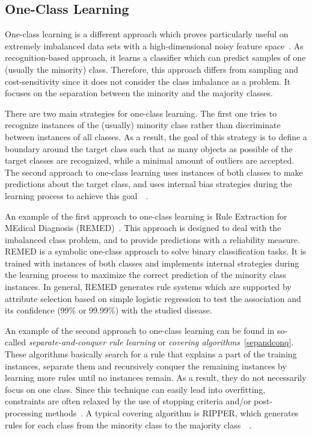 \subsection{One-Class Learning}\label{one-class}
One-class learning is a different approach which proves particularly useful on extremely imbalanced data sets with a high-dimensional noisy feature space~\cite{raskutti}. As recognition-based approach, it learns a classifier which can predict samples of one (usually the minority) class.  Therefore, this approach differs from sampling and cost-sensitivity since it does not consider the class imbalance as a problem. It focuses on the separation between the minority and the majority classes.

There are two main strategies for one-class learning. The first one tries to recognize instances of the (usually) minority class rather than discriminate between instances of all classes. As a result, the goal of this strategy is to define a boundary around the target class such that as many objects as possible of the target classes are recognized, while a minimal amount of outliers are accepted. 
The second approach to one-class learning uses instances of both classes to make predictions about the target class, and uses internal bias strategies during the learning process to achieve this goal~\cite{one-class-classification}~\cite{REMED}.

An example of the first approach to one-class learning is Rule Extraction for MEdical Diagnosis (REMED)~\cite{REMED}. This approach is designed to deal with the imbalanced class problem, and to provide predictions with a reliability measure. REMED is a symbolic one-class approach to solve binary classification tasks. It is trained with instances of both classes and implements internal strategies during the learning process to maximize the correct prediction of the minority class instances. In general, REMED generates rule systems which are supported by attribute selection based on simple logistic regression to test the association and its confidence (99\% or 99.99\%) with the studied disease.

An example of the second approach to one-class learning can be found in so-called \textit{separate-and-conquer rule learning} or \textit{covering algorithms}~\ref{sepandconq}. These algorithms basically search for a rule that explains a part of the training instances, separate them and recursively conquer the remaining instances by learning more rules until no instances remain. As a result, they do not necessarily focus on one class. Since this technique can easily lead into overfitting, constraints are often relaxed by the use of stopping criteria and/or post-processing methods~\cite{sepandconq}. A typical covering algorithm is RIPPER, which generates rules for each class from the minority class to the majority class~\cite{jrip}~\cite{Kotsiantis06}.


